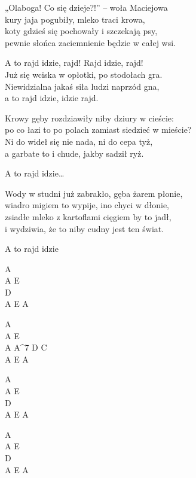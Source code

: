 \begin{text}
    „Olaboga! Co się dzieje?!” – woła Maciejowa\\
    kury jaja pogubiły, mleko traci krowa,\\
    koty gdzieś się pochowały i szczekają psy,\\
    pewnie słońca zaciemnienie będzie w całej wsi.

    \vin A to rajd idzie, rajd! Rajd idzie, rajd!\\
    \vin Już się wciska w opłotki, po stodołach gra.\\
    \vin Niewidzialna jakaś siła ludzi naprzód gna,\\
    \vin a to rajd idzie, idzie rajd.

    Krowy gęby rozdziawiły niby dziury w cieście:\\
    po co łazi to po polach zamiast siedzieć w mieście?\\
    Ni do wideł się nie nada, ni do cepa tyż,\\
    a garbate to i chude, jakby sadził ryż.

    \vin A to rajd idzie…

    Wody w studni już zabrakło, gęba żarem płonie,\\
    wiadro migiem to wypije, ino chyci w dłonie,\\
    zsiadłe mleko z kartoflami cięgiem by to jadł,\\
    i wydziwia, że to niby cudny jest ten świat.

    \vin A to rajd idzie
\end{text}
\begin{chord}
    A\\
    A E\\
    D\\
    A E A

    A\\
    A E\\
    A A^7 D C\\
    A E A

    A\\
    A E\\
    D\\
    A E A\\
    \hfill\break

    A\\
    A E\\
    D\\
    A E A
\end{chord}
